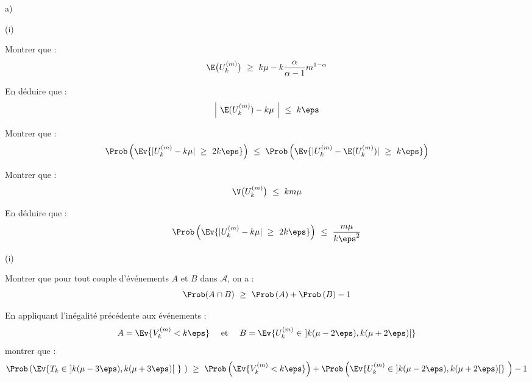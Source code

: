 \documentclass[11pt]{article}%
\begin{document}
\begin{liste}{a)}
  \setcounter{enumi}{6}
\item
  \begin{nonoliste}{(i)}
  \item Montrer que :
    \[
    \E\big(U_{k}^{(m)} \big) \ \geq \ k \mu - k
    \dfrac{\alpha}{\alpha-1} m^{1-\alpha}
    \]

    

  \item En déduire que :
    \[
    \left| \ \E(U_{k}^{(m)}) -k \mu \ \right| \ \leq \  k \eps
    \]

    




  \item Montrer que :
    \[
    \Prob\left(\Ev{ |U_{k}^{(m)} - k \mu| \ \geq \ 2k \eps}\right) \
    \leq \ \Prob\left(\Ev{ |U_{k}^{(m)} - \E(U_{k}^{(m)})| \ \geq \ k
        \eps}\right)
    \]

    

  \item Montrer que :
    \[
    \V\big(U_{k}^{(m)} \big) \ \leq \ km \mu
    \]

    

  \item En déduire que :
    \[
    \Prob\left(\Ev{ |U_{k}^{(m)} - k \mu| \ \geq \  2k \eps}\right) \ \leq
    \ \dfrac{m \mu}{k \eps^{2}}
    \]

    
  \end{nonoliste}

\item
  \begin{nonoliste}{(i)}
  \item Montrer que pour tout couple d'événements $A$ et $B$ dans
    $\mathcal{A}$, on a :
    \[
    \Prob(A \cap B) \ \geq \  \Prob\left(A\right) + \Prob\left(B \right)-1
    \]

    




  \item En appliquant l'inégalité précédente aux événements :
    \[
    A = \Ev{V_{k}^{(m)} < k \eps} \quad \text{ et } \quad B =
    \Ev{U_{k}^{(m)} \in \ ] k(\mu - 2 \eps), k(\mu + 2 \eps)[ }
    \]
    montrer que :
    \[
    \Prob\left(\Ev{T_{k} \in \ ]k(\mu - 3 \eps), k(\mu + 3 \eps)[ \ }
      \ \right) \ \geq \ \Prob\left(\Ev{ V_{k}^{(m)} < k \eps}\right)
    + \Prob\left(\Ev{U_{k}^{(m)} \in \ ]k(\mu - 2 \eps), k(\mu + 2
        \eps)[} \ \right) - 1
    \]


\end{nonoliste}
\end{liste}
\end{document}
